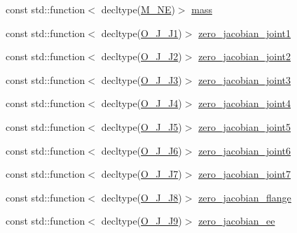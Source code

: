 \begin{DoxyCompactItemize}
\item 
const std\+::function$<$ decltype(\hyperlink{libfcimodels_8h_aba775689b8464577f47c500078e33f18}{M\+\_\+\+NE})$>$ \hyperlink{classfranka_1_1ModelLibrary_a8a7907f501b695b6ea001018d2c0f43a}{mass}
\item 
const std\+::function$<$ decltype(\hyperlink{libfcimodels_8h_a2891907d1cd8adbbd0d3cab6364943cc}{O\+\_\+\+J\+\_\+\+J1})$>$ \hyperlink{classfranka_1_1ModelLibrary_a1efc074de5a722f8a680d8da830a9d3a}{zero\+\_\+jacobian\+\_\+joint1}
\item 
const std\+::function$<$ decltype(\hyperlink{libfcimodels_8h_a08ca89634efba16d0f63c674838edf23}{O\+\_\+\+J\+\_\+\+J2})$>$ \hyperlink{classfranka_1_1ModelLibrary_a5c4cb558fb449e654c4f112e7eb60d2f}{zero\+\_\+jacobian\+\_\+joint2}
\item 
const std\+::function$<$ decltype(\hyperlink{libfcimodels_8h_a771fe182b2784deb41ec785d52831f2f}{O\+\_\+\+J\+\_\+\+J3})$>$ \hyperlink{classfranka_1_1ModelLibrary_a42e9a54673e2cf9a335834401ce3debc}{zero\+\_\+jacobian\+\_\+joint3}
\item 
const std\+::function$<$ decltype(\hyperlink{libfcimodels_8h_a828588da653e0644a742b8191ba7ac2d}{O\+\_\+\+J\+\_\+\+J4})$>$ \hyperlink{classfranka_1_1ModelLibrary_a8b9a5b78f744f681aa5d76c1de7d6631}{zero\+\_\+jacobian\+\_\+joint4}
\item 
const std\+::function$<$ decltype(\hyperlink{libfcimodels_8h_a68952877abb63754a40eb43337203123}{O\+\_\+\+J\+\_\+\+J5})$>$ \hyperlink{classfranka_1_1ModelLibrary_a5d1ac7b7a494e1fcf1062361fe562019}{zero\+\_\+jacobian\+\_\+joint5}
\item 
const std\+::function$<$ decltype(\hyperlink{libfcimodels_8h_ab451dc5c3eb43256070d6fcdbec856db}{O\+\_\+\+J\+\_\+\+J6})$>$ \hyperlink{classfranka_1_1ModelLibrary_a01da3226573d62361c88e09f1f933e28}{zero\+\_\+jacobian\+\_\+joint6}
\item 
const std\+::function$<$ decltype(\hyperlink{libfcimodels_8h_a20be08ea71c920b7f95696b9e56f30ef}{O\+\_\+\+J\+\_\+\+J7})$>$ \hyperlink{classfranka_1_1ModelLibrary_a51bb8156b169d11c1c51aa4752f40730}{zero\+\_\+jacobian\+\_\+joint7}
\item 
const std\+::function$<$ decltype(\hyperlink{libfcimodels_8h_af5cef052abe14b4249bde10d9304ceae}{O\+\_\+\+J\+\_\+\+J8})$>$ \hyperlink{classfranka_1_1ModelLibrary_ae3ea1488f097bb31665b191c0bcdda12}{zero\+\_\+jacobian\+\_\+flange}
\item 
const std\+::function$<$ decltype(\hyperlink{libfcimodels_8h_a6ac9079255c0e6ec91210b89c878bf69}{O\+\_\+\+J\+\_\+\+J9})$>$ \hyperlink{classfranka_1_1ModelLibrary_a29e330024834852fab900cf583164a82}{zero\+\_\+jacobian\+\_\+ee}

\end{DoxyCompactItemize}
